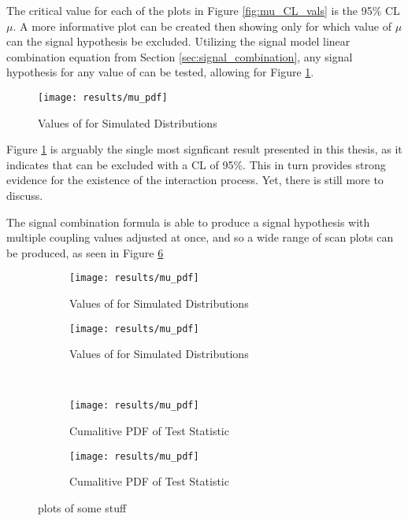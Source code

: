     The critical value for each of the plots in Figure \ref{fig:mu_CL_vals} is the 95\% CL $\mu$.
    A more informative plot can be created then showing only
        for which value of $\mu$ can the signal hypothesis be excluded.
    Utilizing the signal model linear combination equation from Section \ref{sec:signal_combination},
        any signal hypothesis for any value of \kvv can be tested, allowing for Figure \ref{fig:kvv_SM_scan}.

    \begin{figure} %
        \texttt{[image: results/mu\_pdf]}
        \caption{Values of \qtil for Simulated Distributions}
        \label{fig:kvv_SM_scan}
    \end{figure}

    Figure \ref{fig:kvv_SM_scan} is arguably the single most signficant result presented in this thesis,
        as it indicates that  can be excluded with a CL of 95\%.
    This in turn provides strong evidence for the existence of the \HHVV interaction process.
    Yet, there is still more to discuss.

    The signal combination formula is able to produce a signal hypothesis with multiple coupling values adjusted at once,
        and so a wide range of \kvv scan plots can be produced, as seen in Figure \ref{fig:kvv_multi_kl}

    \begin{figure} %
        \centering
        \begin{subfigure}{0.48\textwidth} 
            \texttt{[image: results/mu\_pdf]}
            \caption{Values of \qtil for Simulated Distributions}
            \label{fig:kvv_scan_kl0}
        \end{subfigure}
        \begin{subfigure}{0.48\textwidth} 
            \texttt{[image: results/mu\_pdf]}
            \caption{Values of \qtil for Simulated Distributions}
            \label{fig:kvv_scan_kl1}
        \end{subfigure} \\
        \begin{subfigure}{0.48\textwidth}
            \texttt{[image: results/mu\_pdf]}
            \caption{Cumalitive PDF of \qtil Test Statistic}
            \label{fig:kvv_scan_kl2}
        \end{subfigure}
        \begin{subfigure}{0.48\textwidth}
            \texttt{[image: results/mu\_pdf]}
            \caption{Cumalitive PDF of \qtil Test Statistic}
            \label{fig:kvv_scan_kl10}
        \end{subfigure}
        \caption{
            plots of some stuff
        }\label{fig:kvv_multi_kl}
    \end{figure}

